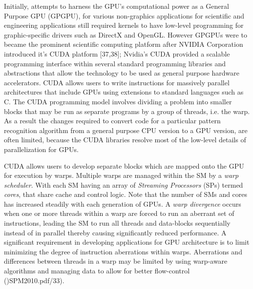 \documentclass[10pt]{article}[draft]
\begin{document}
Initially, attempts to harness the GPU’s computational power as a General Purpose GPU (GPGPU), for various non-graphics applications for scientific and engineering applications still required  kernels to have low-level programming for graphic-specific drivers such as DirectX and OpenGL. However GPGPUs were to became the prominent scientific computing platform  after NVIDIA Corporation introduced it's CUDA platform [37,38]; Nvidia's CUDA provided a scalable programming interface within several standard programming libraries and abstractions that allow the technology to be used as general purpose hardware accelerators.  CUDA allows users to write instructions for massively parallel architectures that include GPUs using extensions to standard languages such as C. The CUDA programming model involves dividing a problem into smaller blocks that may be run as separate programs by a group of threads, i.e. the warp. As a result the changes required to convert code for a particular pattern recognition algorithm from a general purpose CPU version to a GPU version, are often limited, because the CUDA libraries resolve most of the low-level details of parallelization for GPUs. 

CUDA allows users to develop separate blocks which are mapped onto the GPU for execution by warps. Multiple warps are managed within the SM by a \emph{warp scheduler}. With each SM having an array of \emph{Streaming Processors} (SPs) termed \emph{cores}, that share cache and control logic. Note that the number of SMs and cores has increased steadily with each generation of GPUs. A \emph{warp divergence} occurs when one or more threads within a warp are forced to run an aberrant set of instructions, leading the SM to run all threads and data-blocks sequentially instead of in parallel thereby causing significantly reduced performance.  A significant requirement in developing  applications for GPU architecture is to limit minimizing the degree of instruction aberrations within warps. Aberrations and differences between threads in a warp may be limited by using warp-aware algorithms and managing data to allow for better flow-control ()SPM2010.pdf/33).
\end{document}
